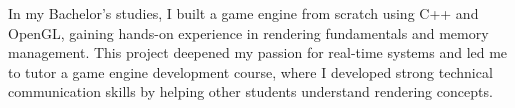 In my Bachelor’s studies, 
I built a game engine from scratch using C++ and OpenGL, 
gaining hands-on experience in rendering fundamentals and memory management. 
This project deepened my passion for real-time systems and 
led me to tutor a game engine development course, 
where I developed strong technical communication skills by helping other students 
understand rendering concepts.